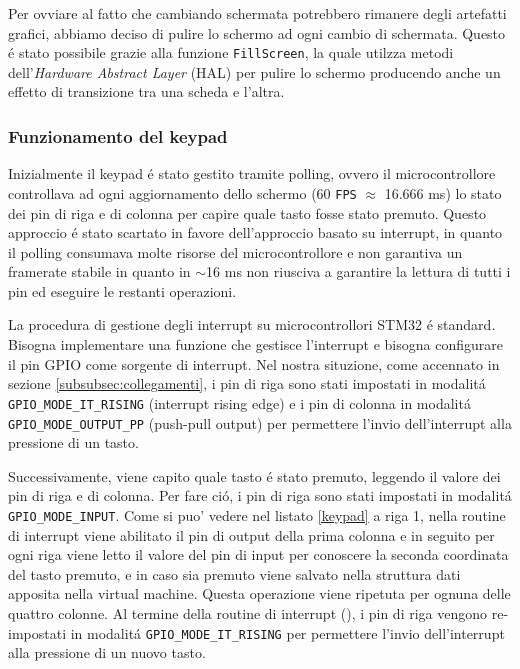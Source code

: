 \documentclass[a4paper]{article}
\begin{document}
Per ovviare al fatto che cambiando schermata potrebbero rimanere degli artefatti grafici, abbiamo deciso di pulire lo schermo ad ogni cambio di schermata. Questo é stato possibile grazie alla funzione \texttt{FillScreen}, la quale utilzza metodi dell'\textit{Hardware Abstract Layer} (HAL) per pulire lo schermo producendo anche un effetto di transizione tra una scheda e l'altra.

\subsubsection{Funzionamento del keypad}\label{subsubsec:keypad}

Inizialmente il keypad é stato gestito tramite polling, ovvero il microcontrollore controllava ad ogni aggiornamento dello schermo (60 \texttt{FPS} $\approx$ 16.666 ms) lo stato dei pin di riga e di colonna per capire quale tasto fosse stato premuto. Questo approccio é stato scartato in favore dell'approccio basato su interrupt, in quanto il polling consumava molte risorse del microcontrollore e non garantiva un framerate stabile in quanto in $\sim$16 ms non riusciva a garantire la lettura di tutti i pin ed eseguire le restanti operazioni.

La procedura di gestione degli interrupt su microcontrollori STM32 é standard. Bisogna implementare una funzione che gestisce l'interrupt e bisogna configurare il pin GPIO come sorgente di interrupt. Nel nostra situzione, come accennato in sezione \ref{subsubsec:collegamenti}, i pin di riga sono stati impostati in modalitá \texttt{GPIO\_MODE\_IT\_RISING} (interrupt rising edge) e i pin di colonna in modalitá \texttt{GPIO\_MODE\_OUTPUT\_PP} (push-pull output) per permettere l'invio dell'interrupt alla pressione di un tasto.

Successivamente, viene capito quale tasto é stato premuto, leggendo il valore dei pin di riga e di colonna. Per fare ció, i pin di riga sono stati impostati in modalitá \texttt{GPIO\_MODE\_INPUT}. Come si puo' vedere nel listato \ref{keypad} a riga 1, nella routine di interrupt viene abilitato il pin di output della prima colonna e in seguito per ogni riga viene letto il valore del pin di input per conoscere la seconda coordinata del tasto premuto, e in caso sia premuto viene salvato nella struttura dati apposita nella virtual machine. Questa operazione viene ripetuta per ognuna delle quattro colonne.
Al termine della routine di interrupt (), i pin di riga vengono re-impostati in modalitá \texttt{GPIO\_MODE\_IT\_RISING} per permettere l'invio dell'interrupt alla pressione di un nuovo tasto.
\end{document}

